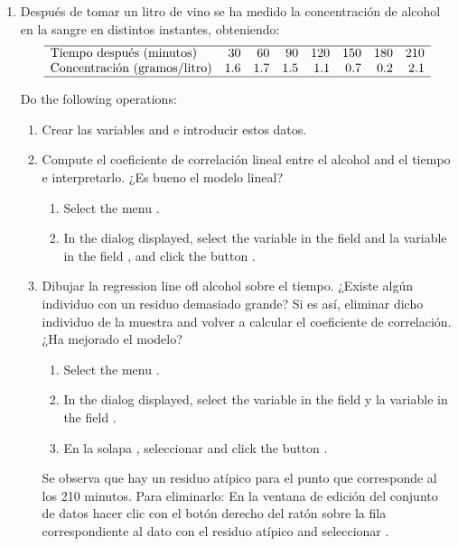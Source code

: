 \begin{enumerate}[leftmargin=*]
\item Después de tomar un litro de vino se ha medido la concentración de alcohol en la sangre en distintos instantes,
obteniendo:
\[
\begin{array}{lrrrrrrr}
\hline 
\mbox{Tiempo después (minutos)} & 30 & 60 & 90 & 120 & 150 & 180 & 210\\ 
\mbox{Concentración (gramos/litro)} & 1.6 & 1.7 & 1.5 & 1.1 & 0.7 & 0.2 & 2.1\\
\hline
\end{array}
\]

Do the following operations:
\begin{enumerate}
\item Crear las variables  and  e introducir estos datos.
\item Compute el coeficiente de correlación lineal entre el alcohol and el tiempo e interpretarlo. ¿Es bueno el modelo
lineal? 
\begin{indication}
\begin{enumerate}
\item Select the menu .
\item In the dialog displayed, select the variable  in the field  and la variable  in the field , and click the button
.
\end{enumerate}
\end{indication}

\item Dibujar la regression line ofl alcohol sobre el tiempo. 
¿Existe algún individuo con un residuo demasiado grande? 
Si es así, eliminar dicho individuo de la muestra and volver a calcular el coeficiente de correlación. 
¿Ha mejorado el modelo?
\begin{indication}
\begin{enumerate}
\item Select the menu .
\item In the dialog displayed, select the variable  in the field  y
la variable  in the field .
\item En la solapa , seleccionar  and click the button .
\end{enumerate}
Se observa que hay un residuo atípico para el punto que corresponde al los 210 minutos. 
Para eliminarlo:
En la ventana de edición del conjunto de datos hacer clic con el botón derecho del ratón sobre la fila correspondiente
al dato con el residuo atípico and seleccionar .
\end{indication}


\end{enumerate}
\end{enumerate}
